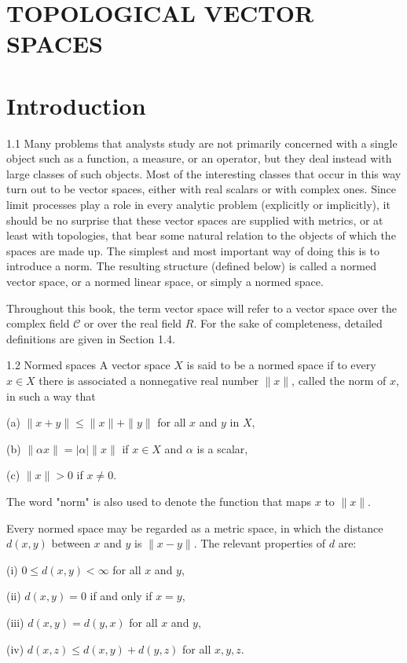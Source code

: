 \documentclass[10pt]{article}
\begin{document}
\section{TOPOLOGICAL VECTOR SPACES}
\section{Introduction}
1.1 Many problems that analysts study are not primarily concerned with a single object such as a function, a measure, or an operator, but they deal instead with large classes of such objects. Most of the interesting classes that occur in this way turn out to be vector spaces, either with real scalars or with complex ones. Since limit processes play a role in every analytic problem (explicitly or implicitly), it should be no surprise that these vector spaces are supplied with metrics, or at least with topologies, that bear some natural relation to the objects of which the spaces are made up. The simplest and most important way of doing this is to introduce a norm. The resulting structure (defined below) is called a normed vector space, or a normed linear space, or simply a normed space.

Throughout this book, the term vector space will refer to a vector space over the complex field $\mathscr{C}$ or over the real field $R$. For the sake of completeness, detailed definitions are given in Section 1.4.

1.2 Normed spaces A vector space $X$ is said to be a normed space if to every $x \in X$ there is associated a nonnegative real number $\|x\|$, called the norm of $x$, in such a way that

(a) $\|x+y\| \leq\|x\|+\|y\|$ for all $x$ and $y$ in $X$,

(b) $\|\alpha x\|=|\alpha|\|x\|$ if $x \in X$ and $\alpha$ is a scalar,

(c) $\|x\|>0$ if $x \neq 0$.

The word "norm" is also used to denote the function that maps $x$ to $\|x\|$.

Every normed space may be regarded as a metric space, in which the distance $d(x, y)$ between $x$ and $y$ is $\|x-y\|$. The relevant properties of $d$ are:

(i) $0 \leq d(x, y)<\infty$ for all $x$ and $y$,

(ii) $d(x, y)=0$ if and only if $x=y$,

(iii) $d(x, y)=d(y, x)$ for all $x$ and $y$,

(iv) $d(x, z) \leq d(x, y)+d(y, z)$ for all $x, y, z$.
\end{document}
